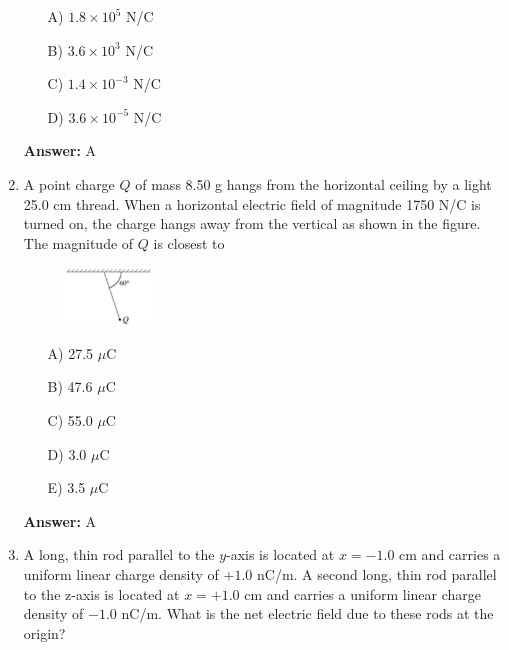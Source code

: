\begin{enumerate}
    \begin{multicols}{5}
    \begin{itemize}
        \item[A)] $1.8\times10^5$ N/C
        \item[B)] $3.6\times10^3$ N/C
        \item[C)] $1.4\times10^{-3}$ N/C
        \item[D)] $3.6\times10^{-5}$ N/C
    \end{itemize}
    \end{multicols}

    \textbf{Answer:} A

    \item A point charge $Q$ of mass 8.50 g hangs from the horizontal ceiling by a light 25.0 cm thread. When a horizontal electric field of magnitude 1750 N/C is turned on, the charge hangs away from the vertical as shown in the figure. The magnitude of $Q$ is closest to

    \begin{figure}[H]
        \centering
        \includegraphics[width=0.22\textwidth]{figures-workshop01/problem-10.png}
    \end{figure}

    \begin{multicols}{5}
    \begin{itemize}
        \item[A)] 27.5 $\mu$C
        \item[B)] 47.6 $\mu$C
        \item[C)] 55.0 $\mu$C
        \item[D)] 3.0 $\mu$C
        \item[E)] 3.5 $\mu$C
    \end{itemize}
    \end{multicols}

    \textbf{Answer:} A

    \item A long, thin rod parallel to the $y$-axis is located at $x = -1.0$ cm and carries a uniform linear charge density of $+1.0$ nC/m. A second long, thin rod parallel to the z-axis is located at $x=+1.0$ cm and carries a uniform linear charge density of $-1.0$ nC/m. What is the net electric field due to these rods at the origin?


\end{enumerate}
